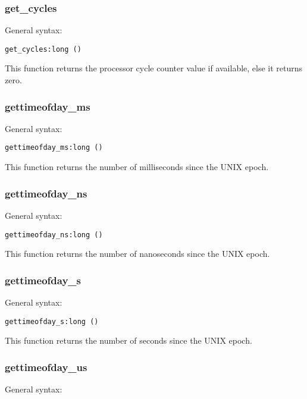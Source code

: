 \documentclass[twoside,english]{article}
\newenvironment{vindent}
{\begin{list}{}{\setlength{\listparindent}{6pt}}
\item[]}
{\end{list}}
\begin{document}
\subsubsection{get\_cycles}
General syntax:

\begin{vindent}
\begin{verbatim}
get_cycles:long ()
\end{verbatim}
\end{vindent}
This function returns the processor cycle counter value if available, else
it returns zero.


\subsubsection{gettimeofday\_ms}
General syntax:

\begin{vindent}
\begin{verbatim}
gettimeofday_ms:long ()
\end{verbatim}
\end{vindent}
This function returns the number of milliseconds since the UNIX epoch.


\subsubsection{gettimeofday\_ns}
General syntax:

\begin{vindent}
\begin{verbatim}
gettimeofday_ns:long ()
\end{verbatim}
\end{vindent}
This function returns the number of nanoseconds since the UNIX epoch.


\subsubsection{gettimeofday\_s}
General syntax:

\begin{vindent}
\begin{verbatim}
gettimeofday_s:long ()
\end{verbatim}
\end{vindent}
This function returns the number of seconds since the UNIX epoch.


\subsubsection{gettimeofday\_us}
General syntax:
\end{document}
